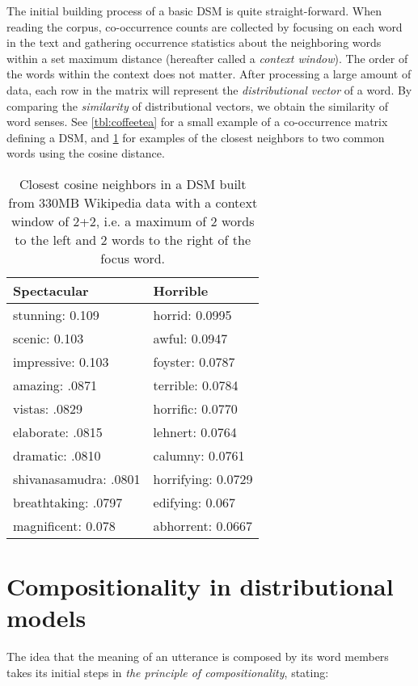 The initial building process of a basic DSM is quite straight-forward. When reading the corpus, co-occurrence counts are collected by focusing on each word in the text and gathering occurrence statistics about the neighboring words within a set maximum distance (hereafter called a \emph{context window}). The order of the words within the context does not matter. After processing a large amount of data, each row in the matrix will represent the \emph{distributional vector} of a word. By comparing the \emph{similarity} of distributional vectors, we obtain the similarity of word senses. See \cref{tbl:coffeetea} for a small example of a co-occurrence matrix defining a DSM, and \cref{tbl:neighbors} for examples of the closest neighbors to two common words using the cosine distance.

\begin{table}[H]
\centering
\begin{tabular}{ll}
\toprule
Spectacular           & Horrible           \\
\hline
stunning: 0.109       & horrid: 0.0995     \\
scenic: 0.103         & awful: 0.0947      \\
impressive: 0.103     & foyster: 0.0787    \\
amazing: .0871        & terrible: 0.0784   \\
vistas: .0829         & horrific: 0.0770   \\
elaborate: .0815      & lehnert: 0.0764    \\
dramatic: .0810       & calumny: 0.0761    \\
shivanasamudra: .0801 & horrifying: 0.0729 \\
breathtaking: .0797   & edifying: 0.067    \\
magnificent: 0.078    & abhorrent: 0.0667  \\
\bottomrule
\end{tabular}
\caption{Closest cosine neighbors in a DSM built from 330MB Wikipedia data with a context window of 2+2, i.e. a maximum of 2 words to the left and 2 words to the right of the focus word.}
\label{tbl:neighbors}
\end{table}


\section{Compositionality in distributional models}
\label{background-compositionality}

The idea that the meaning of an utterance is composed by its word members takes its initial steps in \emph{the principle of compositionality}, stating:

